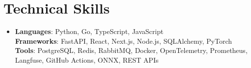 \documentclass[letterpaper,11pt]{article}
\begin{document}
\section{Technical Skills}
\begin{itemize}[leftmargin=0.15in, label={}, topsep=0pt, itemsep=0pt, parsep=0pt, partopsep=0pt]
  \item{\fontsize{9.0pt}{9.25pt}\selectfont
   \textbf{Languages}{: Python, Go, TypeScript, JavaScript} \\
   \textbf{Frameworks}{: FastAPI, React, Next.js, Node.js, SQLAlchemy, PyTorch} \\
   \textbf{Tools}{: PostgreSQL, Redis, RabbitMQ, Docker, OpenTelemetry, Prometheus, Langfuse, GitHub Actions, ONNX, REST APIs} \\
  }
\end{itemize}
\end{document}
